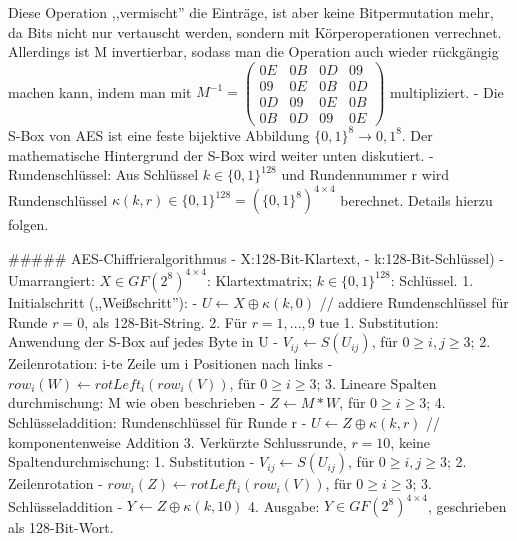\documentclass[a4paper]{article}
\begin{document}
\begin{multicols}{3}
Diese Operation ,,vermischt'' die Einträge, ist aber keine Bitpermutation mehr, da Bits nicht nur vertauscht werden, sondern mit Körperoperationen verrechnet. Allerdings ist M invertierbar, sodass man die Operation auch wieder rückgängig machen kann, indem man mit $M^{-1}=\begin{pmatrix} 0E& 0B& 0D& 09\\ 09& 0E& 0B& 0D\\ 0D& 09& 0E& 0B\\ 0B& 0D& 09& 0E\end{pmatrix}$ multipliziert.
- Die S-Box von AES ist eine feste bijektive Abbildung $\{0,1\}^8\rightarrow {0,1}^8$. Der mathematische Hintergrund der S-Box wird weiter unten diskutiert.
- Rundenschlüssel: Aus Schlüssel $k\in\{0,1\}^{128}$ und Rundennummer r wird Rundenschlüssel $\kappa (k,r)\in\{0,1\}^{128}=(\{0,1\}^8)^{4\times 4}$ berechnet. Details hierzu folgen.

##### AES-Chiffrieralgorithmus
- X:128-Bit-Klartext, 
- k:128-Bit-Schlüssel)
- Umarrangiert: $X\in GF(2^8)^{4\times 4}$: Klartextmatrix; $k\in\{0,1\}^{128}$: Schlüssel.
1. Initialschritt (,,Weißschritt''):
    - $U\leftarrow X\oplus \kappa (k,0)$ // addiere Rundenschlüssel für Runde $r=0$, als 128-Bit-String.
2. Für $r=1,...,9$ tue
    1. Substitution: Anwendung der S-Box auf jedes Byte in U
        - $V_{ij}\leftarrow S(U_{ij})$, für $0\geq i,j\geq 3$;
    2. Zeilenrotation: i-te Zeile um i Positionen nach links
        - $row_i(W)\leftarrow rotLeft_i(row_i(V))$, für $0\geq i\geq 3$;
    3. Lineare Spalten durchmischung: M wie oben beschrieben
        - $Z\leftarrow M*W$, für $0\geq i\geq 3$;
    4. Schlüsseladdition: Rundenschlüssel für Runde r
        - $U\leftarrow Z\oplus \kappa (k,r)$ // komponentenweise Addition
3. Verkürzte Schlussrunde, $r=10$, keine Spaltendurchmischung:
    1. Substitution
        - $V_{ij}\leftarrow S(U_{ij})$, für $0\geq i,j\geq 3$;
    2. Zeilenrotation
        - $row_i(Z)\leftarrow rotLeft_i(row_i(V))$, für $0\geq i\geq 3$;
    3. Schlüsseladdition
        - $Y\leftarrow Z\oplus \kappa (k,10)$
4. Ausgabe: $Y\in GF(2^8)^{4\times 4}$, geschrieben als 128-Bit-Wort.


\end{multicols}
\end{document}
